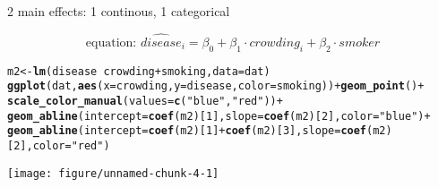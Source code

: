 \documentclass[table]{beamer}\usepackage[]{graphicx}\usepackage[]{color}
\makeatletter
\def\maxwidth{ %
  \ifdim\Gin@nat@width>\linewidth
    \linewidth
  \else
    \Gin@nat@width
  \fi
}
\newcommand{\hlnum}[1]{\textcolor[rgb]{0.686,0.059,0.569}{#1}}%
\newcommand{\hlstr}[1]{\textcolor[rgb]{0.192,0.494,0.8}{#1}}%
\newcommand{\hlopt}[1]{\textcolor[rgb]{0,0,0}{#1}}%
\newcommand{\hlstd}[1]{\textcolor[rgb]{0.345,0.345,0.345}{#1}}%
\newcommand{\hlkwb}[1]{\textcolor[rgb]{0.69,0.353,0.396}{#1}}%
\newcommand{\hlkwc}[1]{\textcolor[rgb]{0.333,0.667,0.333}{#1}}%
\newcommand{\hlkwd}[1]{\textcolor[rgb]{0.737,0.353,0.396}{\textbf{#1}}}%
\newenvironment{kframe}{%
 \def\at@end@of@kframe{}%
 \ifinner\ifhmode%
  \def\at@end@of@kframe{\end{minipage}}%
  \begin{minipage}{\columnwidth}%
 \fi\fi%
 \def\FrameCommand##1{\hskip\@totalleftmargin \hskip-\fboxsep
 \colorbox{shadecolor}{##1}\hskip-\fboxsep
     \hskip-\linewidth \hskip-\@totalleftmargin \hskip\columnwidth}%
 \MakeFramed {\advance\hsize-\width
   \@totalleftmargin\z@ \linewidth\hsize
   \@setminipage}}%
 {\par\unskip\endMakeFramed%
 \at@end@of@kframe}
\newenvironment{knitrout}{}{} %
\makeatother
\begin{document}

\begin{frame}[fragile]{2 main effects: 1 continous, 1 categorical}

$$ \mbox{equation: \ }  \widehat{disease}_i = \beta_0 + \beta_1\cdot crowding_i + \beta_2 \cdot smoker $$

\begin{knitrout}\scriptsize
{}\color{fgcolor}\begin{kframe}
\begin{alltt}
\hlstd{m2} \hlkwb{<-} \hlkwd{lm}\hlstd{(disease} \hlopt{~} \hlstd{crowding} \hlopt{+} \hlstd{smoking,} \hlkwc{data}\hlstd{=dat)}
\hlkwd{ggplot}\hlstd{(dat,} \hlkwd{aes}\hlstd{(}\hlkwc{x}\hlstd{=crowding,} \hlkwc{y}\hlstd{=disease,} \hlkwc{color}\hlstd{=smoking))} \hlopt{+} \hlkwd{geom_point}\hlstd{()} \hlopt{+}
  \hlkwd{scale_color_manual}\hlstd{(}\hlkwc{values} \hlstd{=} \hlkwd{c}\hlstd{(}\hlstr{"blue"}\hlstd{,} \hlstr{"red"}\hlstd{))} \hlopt{+}
  \hlkwd{geom_abline}\hlstd{(}\hlkwc{intercept} \hlstd{=} \hlkwd{coef}\hlstd{(m2)[}\hlnum{1}\hlstd{],} \hlkwc{slope} \hlstd{=} \hlkwd{coef}\hlstd{(m2)[}\hlnum{2}\hlstd{],} \hlkwc{color}\hlstd{=}\hlstr{"blue"}\hlstd{)} \hlopt{+}
  \hlkwd{geom_abline}\hlstd{(}\hlkwc{intercept} \hlstd{=} \hlkwd{coef}\hlstd{(m2)[}\hlnum{1}\hlstd{]}\hlopt{+}\hlkwd{coef}\hlstd{(m2)[}\hlnum{3}\hlstd{],} \hlkwc{slope} \hlstd{=} \hlkwd{coef}\hlstd{(m2)[}\hlnum{2}\hlstd{],} \hlkwc{color}\hlstd{=}\hlstr{"red"}\hlstd{)}
\end{alltt}
\end{kframe}
\texttt{[image: figure/unnamed-chunk-4-1]} 

\end{knitrout}

\end{frame}


\end{document}
